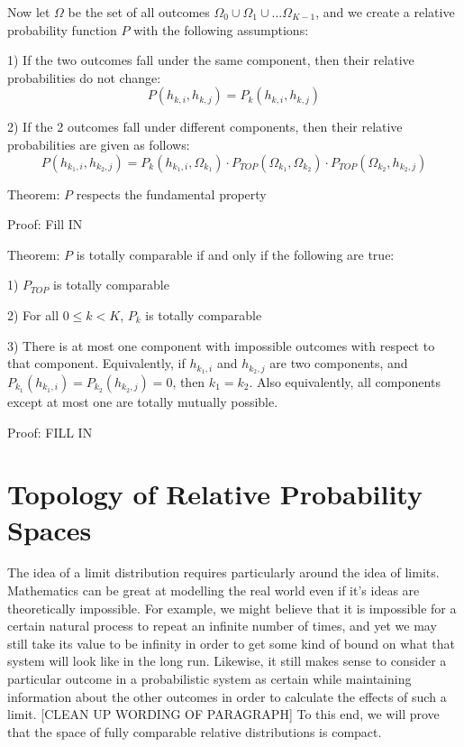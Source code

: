 \documentclass[twoside]{article}
\begin{document}
Now let \(\Omega\) be the set of all outcomes \(\Omega_0 \cup \Omega_1 \cup \dots \Omega_{K-1}\), and we create a relative probability function \(P\) with the following assumptions:

1) If the two outcomes fall under the same component, then their relative probabilities do not change:
\[P(h_{k, i}, h_{k, j}) = P_k(h_{k, i}, h_{k, j})\]

2) If the 2 outcomes fall under different components, then their relative probabilities are given as follows:
\[P(h_{k_1, i}, h_{k_2, j}) = P_k(h_{k_1, i}, \Omega_{k_1}) \cdot  P_{TOP}(\Omega_{k_1}, \Omega_{k_2}) \cdot P_{TOP}(\Omega_{k_2}, h_{k_2, j})\]

Theorem: \(P\) respects the fundamental property

Proof: Fill IN

Theorem: \(P\) is totally comparable if and only if the following are true:

1) \(P_{TOP}\) is totally comparable

2) For all \(0 \leq k < K\), \(P_k\) is totally comparable

3) There is at most one component with impossible outcomes with respect to that component. Equivalently, if \(h_{k_1, i}\) and \(h_{k_2, j}\) are two components, and \(P_{k_1}(h_{k_1, i}) = P_{k_2}(h_{k_2, j}) = 0\), then \(k_1 = k_2\). Also equivalently, all components except at most one are totally mutually possible.

Proof: FILL IN

\section{Topology of Relative Probability Spaces}

The idea of a limit distribution requires particularly around the idea of limits. Mathematics can be great at modelling the real world even if it's ideas are theoretically impossible. For example, we might believe that it is impossible for a certain natural process to repeat an infinite number of times, and yet we may still take its value to be infinity in order to get some kind of bound on what that system will look like in the long run. Likewise, it still makes sense to consider a particular outcome in a probabilistic system as certain while maintaining information about the other outcomes in order to calculate the effects of such a limit. [CLEAN UP WORDING OF PARAGRAPH] To this end, we will prove that the space of fully comparable relative distributions is compact.
\end{document}
